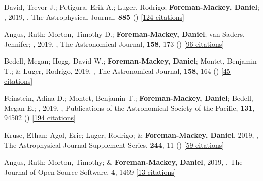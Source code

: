 \item[{\color{numcolor}\scriptsize50}] David, Trevor J.; Petigura, Erik A.; Luger, Rodrigo; \textbf{Foreman-Mackey, Daniel}; \etal, 2019, , The Astrophysical Journal, \textbf{885} () [\href{https://ui.adsabs.harvard.edu/abs/2019ApJ...885L..12D}{124 citations}]

\item[{\color{numcolor}\scriptsize49}] Angus, Ruth; Morton, Timothy D.; \textbf{Foreman-Mackey, Daniel}; van Saders, Jennifer; \etal, 2019, , The Astronomical Journal, \textbf{158}, 173 () [\href{https://ui.adsabs.harvard.edu/abs/2019AJ....158..173A}{96 citations}]

\item[{\color{numcolor}\scriptsize48}] Bedell, Megan; Hogg, David W.; \textbf{Foreman-Mackey, Daniel}; Montet, Benjamin T.; \& Luger, Rodrigo, 2019, , The Astronomical Journal, \textbf{158}, 164 () [\href{https://ui.adsabs.harvard.edu/abs/2019AJ....158..164B}{45 citations}]

\item[{\color{numcolor}\scriptsize47}] Feinstein, Adina D.; Montet, Benjamin T.; \textbf{Foreman-Mackey, Daniel}; Bedell, Megan E.; \etal, 2019, , Publications of the Astronomical Society of the Pacific, \textbf{131}, 94502 () [\href{https://ui.adsabs.harvard.edu/abs/2019PASP..131i4502F}{194 citations}]

\item[{\color{numcolor}\scriptsize46}] Kruse, Ethan; Agol, Eric; Luger, Rodrigo; \& \textbf{Foreman-Mackey, Daniel}, 2019, , The Astrophysical Journal Supplement Series, \textbf{244}, 11 () [\href{https://ui.adsabs.harvard.edu/abs/2019ApJS..244...11K}{59 citations}]

\item[{\color{numcolor}\scriptsize45}] Angus, Ruth; Morton, Timothy; \& \textbf{Foreman-Mackey, Daniel}, 2019, , The Journal of Open Source Software, \textbf{4}, 1469 [\href{https://ui.adsabs.harvard.edu/abs/2019JOSS....4.1469A}{13 citations}]

